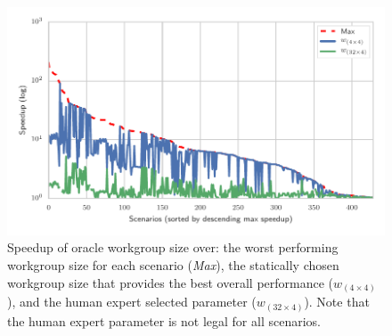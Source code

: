 \documentclass[nonatbib,preprint,9pt]{sigplanconf}
\begin{document}


\begin{figure}
  \includegraphics[width=\columnwidth]{img/max_speedups}
  \caption[Workgroup size speedups]{%
    Speedup of oracle workgroup size over: the worst performing
    workgroup size for each scenario (\emph{Max}), the statically
    chosen workgroup size that provides the best overall performance
    ($w_{(4 \times 4)}$), and the human expert selected parameter
    ($w_{(32 \times 4)}$). Note that the human expert parameter is not
    legal for all scenarios.%
  }
\label{fig:speedups}
\end{figure}
\end{document}

